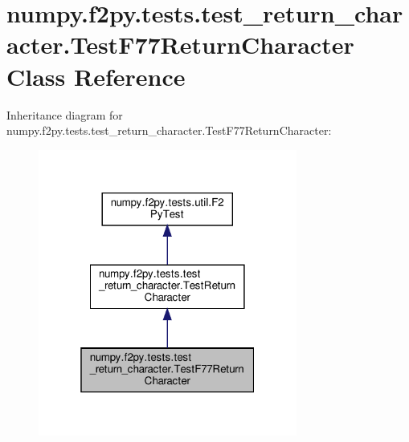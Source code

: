 \hypertarget{classnumpy_1_1f2py_1_1tests_1_1test__return__character_1_1TestF77ReturnCharacter}{}\section{numpy.\+f2py.\+tests.\+test\+\_\+return\+\_\+character.\+Test\+F77\+Return\+Character Class Reference}
\label{classnumpy_1_1f2py_1_1tests_1_1test__return__character_1_1TestF77ReturnCharacter}


Inheritance diagram for numpy.\+f2py.\+tests.\+test\+\_\+return\+\_\+character.\+Test\+F77\+Return\+Character\+:
\nopagebreak
\begin{figure}[H]
\begin{center}
\leavevmode
\includegraphics[width=241pt]{classnumpy_1_1f2py_1_1tests_1_1test__return__character_1_1TestF77ReturnCharacter__inherit__graph}
\end{center}
\end{figure}



